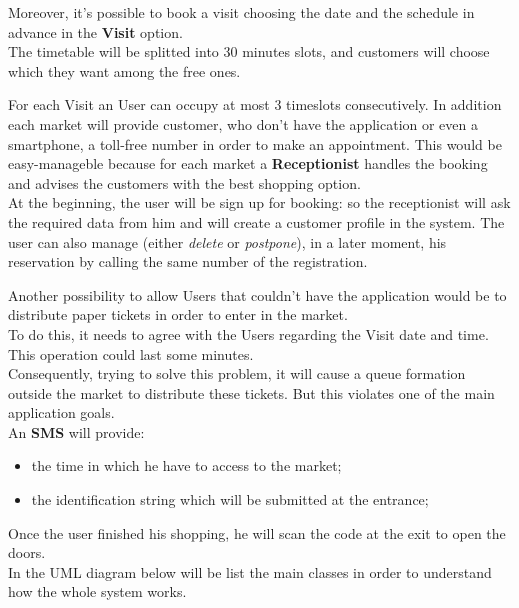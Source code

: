 \par
Moreover, it's possible to book a visit choosing the date and the schedule in advance in the \textbf{Visit} option. 
\\
The timetable will be splitted into 30 minutes slots, and customers will choose which they want among the free ones. \par
For each Visit an User can occupy at most 3 timeslots consecutively.
In addition each market will provide customer, who don't have the application or even a smartphone, a toll-free number in order to make an appointment.
This would be easy-manageble because for each market a \textbf{Receptionist} handles the booking and advises the customers with the best shopping option.\\
At the beginning, the user will be sign up for booking: so the receptionist will ask the required data from him and will create a customer profile in the system.
The user can also manage (either \textit{delete} or \textit{postpone}), in a later moment, his reservation by calling the same number of the registration.\par
Another possibility to allow Users that couldn't have the application would be to distribute paper tickets in order to enter in the market.\\
To do this, it needs to agree with the Users regarding the Visit date and time. This operation could last some minutes.\\
Consequently, trying to solve this problem, it will cause a queue formation outside the market to distribute these tickets. But this violates one of the main application goals.
\\
An \textbf{SMS} will provide:
\begin{itemize}
\item the time in which he have to access to the market;
\item the identification string which will be submitted at the entrance;
\end{itemize}

Once the user finished his shopping, he will scan the code at the exit to open the doors.\\
In the UML diagram below will be list the main classes in order to understand how the whole system works.

